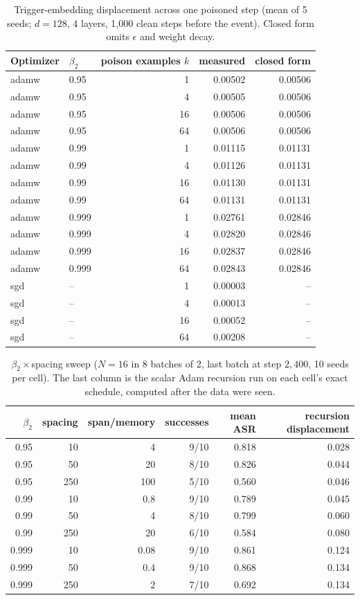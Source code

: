 \documentclass{article} %
\begin{document}
\begin{table}[ht]
\caption{Trigger-embedding displacement across one poisoned step (mean of 5 seeds; $d=128$, 4 layers, 1{,}000 clean steps before the event). Closed form omits $\epsilon$ and weight decay.}
\label{tab:embdisp}
\centering
\small
\begin{tabular}{llrrr}
\toprule
Optimizer & $\beta_2$ & poison examples $k$ & measured & closed form \\
\midrule
adamw & 0.95 & 1 & 0.00502 & 0.00506 \\
adamw & 0.95 & 4 & 0.00505 & 0.00506 \\
adamw & 0.95 & 16 & 0.00506 & 0.00506 \\
adamw & 0.95 & 64 & 0.00506 & 0.00506 \\
adamw & 0.99 & 1 & 0.01115 & 0.01131 \\
adamw & 0.99 & 4 & 0.01126 & 0.01131 \\
adamw & 0.99 & 16 & 0.01130 & 0.01131 \\
adamw & 0.99 & 64 & 0.01131 & 0.01131 \\
adamw & 0.999 & 1 & 0.02761 & 0.02846 \\
adamw & 0.999 & 4 & 0.02820 & 0.02846 \\
adamw & 0.999 & 16 & 0.02837 & 0.02846 \\
adamw & 0.999 & 64 & 0.02843 & 0.02846 \\
sgd & -- & 1 & 0.00003 & -- \\
sgd & -- & 4 & 0.00013 & -- \\
sgd & -- & 16 & 0.00052 & -- \\
sgd & -- & 64 & 0.00208 & -- \\
\bottomrule
\end{tabular}
\end{table}

\begin{table}[ht]
\caption{$\beta_2\times$spacing sweep ($N=16$ in 8 batches of 2, last batch at step $2{,}400$, 10 seeds per cell). The last column is the scalar Adam recursion run on each cell's exact schedule, computed after the data were seen.}
\label{tab:beta2}
\centering
\small
\begin{tabular}{rrrrrr}
\toprule
$\beta_2$ & spacing & span/memory & successes & mean ASR & recursion displacement \\
\midrule
0.95 & 10 & 4 & 9/10 & 0.818 & 0.028 \\
0.95 & 50 & 20 & 8/10 & 0.826 & 0.044 \\
0.95 & 250 & 100 & 5/10 & 0.560 & 0.046 \\
0.99 & 10 & 0.8 & 9/10 & 0.789 & 0.045 \\
0.99 & 50 & 4 & 8/10 & 0.799 & 0.060 \\
0.99 & 250 & 20 & 6/10 & 0.584 & 0.080 \\
0.999 & 10 & 0.08 & 9/10 & 0.861 & 0.124 \\
0.999 & 50 & 0.4 & 9/10 & 0.868 & 0.134 \\
0.999 & 250 & 2 & 7/10 & 0.692 & 0.134 \\
\bottomrule
\end{tabular}
\end{table}
\end{document}
